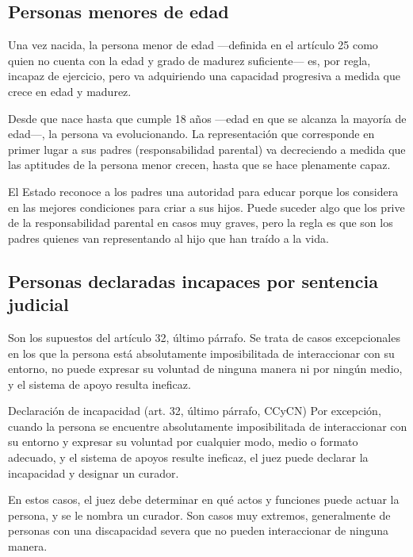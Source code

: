 \documentclass[12pt,oneside]{book}
\begin{document}
\subsection{Personas menores de edad}

Una vez nacida, la persona menor de edad —definida en el artículo 25 como quien no cuenta con la edad y grado de madurez suficiente— es, por regla, incapaz de ejercicio, pero va adquiriendo una capacidad progresiva a medida que crece en edad y madurez.

\begin{important}
Desde que nace hasta que cumple 18 años —edad en que se alcanza la mayoría de edad—, la persona va evolucionando. La representación que corresponde en primer lugar a sus padres (responsabilidad parental) va decreciendo a medida que las aptitudes de la persona menor crecen, hasta que se hace plenamente capaz.
\end{important}

El Estado reconoce a los padres una autoridad para educar porque los considera en las mejores condiciones para criar a sus hijos. Puede suceder algo que los prive de la responsabilidad parental en casos muy graves, pero la regla es que son los padres quienes van representando al hijo que han traído a la vida.

\subsection{Personas declaradas incapaces por sentencia judicial}

Son los supuestos del artículo 32, último párrafo. Se trata de casos excepcionales en los que la persona está absolutamente imposibilitada de interaccionar con su entorno, no puede expresar su voluntad de ninguna manera ni por ningún medio, y el sistema de apoyo resulta ineficaz.

\begin{definition}{Declaración de incapacidad (art. 32, último párrafo, CCyCN)}
Por excepción, cuando la persona se encuentre absolutamente imposibilitada de interaccionar con su entorno y expresar su voluntad por cualquier modo, medio o formato adecuado, y el sistema de apoyos resulte ineficaz, el juez puede declarar la incapacidad y designar un curador.
\end{definition}

En estos casos, el juez debe determinar en qué actos y funciones puede actuar la persona, y se le nombra un curador. Son casos muy extremos, generalmente de personas con una discapacidad severa que no pueden interaccionar de ninguna manera.
\end{document}
